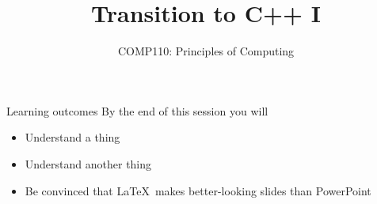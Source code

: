 \documentclass[xcolor={dvipsnames}]{beamer}\usepackage{etoolbox}\newtoggle{printable}\togglefalse{printable}
\begin{document}
\title{Transition to C++ I}   
\subtitle{COMP110: Principles of Computing}

\frame{\titlepage} 

\begin{frame}{Learning outcomes}
	By the end of this session you will
	\begin{itemize}
		\item Understand a thing
		\item Understand another thing
		\item Be convinced that \LaTeX\ makes better-looking slides than PowerPoint
	\end{itemize}
\end{frame}

%

%




%
\end{document}
